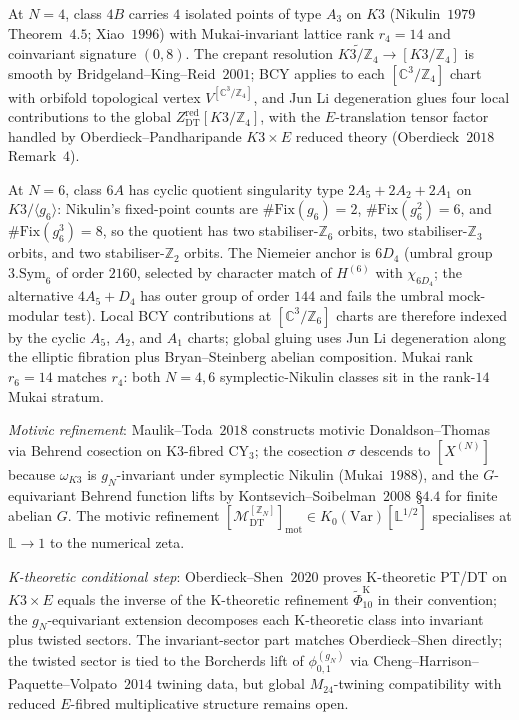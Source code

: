 \begin{remark}
At $N = 4$, class $4B$ carries $4$ isolated points of type $A_3$ on $K3$ (Nikulin~$1979$ Theorem~$4.5$; Xiao~$1996$) with Mukai-invariant lattice rank $r_4 = 14$ and coinvariant signature $(0, 8)$. The crepant resolution $\widetilde{K3/\mathbb{Z}_4} \to [K3/\mathbb{Z}_4]$ is smooth by Bridgeland--King--Reid~$2001$; BCY applies to each $[\mathbb{C}^3/\mathbb{Z}_4]$ chart with orbifold topological vertex $V^{[\mathbb{C}^3/\mathbb{Z}_4]}$, and Jun Li degeneration glues four local contributions to the global $Z^{\mathrm{red}}_{\mathrm{DT}}[K3/\mathbb{Z}_4]$, with the $E$-translation tensor factor handled by Oberdieck--Pandharipande $K3 \times E$ reduced theory (Oberdieck~$2018$ Remark~$4$).

At $N = 6$, class $6A$ has cyclic quotient singularity type $2 A_5 + 2 A_2 + 2 A_1$ on $K3/\langle g_6\rangle$: Nikulin's fixed-point counts are $\#\mathrm{Fix}(g_6)=2$, $\#\mathrm{Fix}(g_6^2)=6$, and $\#\mathrm{Fix}(g_6^3)=8$, so the quotient has two stabiliser-$\mathbb{Z}_6$ orbits, two stabiliser-$\mathbb{Z}_3$ orbits, and two stabiliser-$\mathbb{Z}_2$ orbits. The Niemeier anchor is $6 D_4$ (umbral group $3.\mathrm{Sym}_6$ of order $2160$, selected by character match of $H^{(6)}$ with $\chi_{6 D_4}$; the alternative $4 A_5 + D_4$ has outer group of order $144$ and fails the umbral mock-modular test). Local BCY contributions at $[\mathbb{C}^3/\mathbb{Z}_6]$ charts are therefore indexed by the cyclic $A_5$, $A_2$, and $A_1$ charts; global gluing uses Jun Li degeneration along the elliptic fibration plus Bryan--Steinberg abelian composition. Mukai rank $r_6 = 14$ matches $r_4$: both $N = 4, 6$ symplectic-Nikulin classes sit in the rank-$14$ Mukai stratum.

\emph{Motivic refinement}: Maulik--Toda~$2018$ constructs motivic Donaldson--Thomas via Behrend cosection on K3-fibred CY$_3$; the cosection $\sigma$ descends to $[X^{(N)}]$ because $\omega_{K3}$ is $g_N$-invariant under symplectic Nikulin (Mukai~$1988$), and the $G$-equivariant Behrend function lifts by Kontsevich--Soibelman~$2008$ \S$4.4$ for finite abelian $G$. The motivic refinement $[\mathcal{M}^{[\mathbb{Z}_N]}_{\mathrm{DT}}]_{\mathrm{mot}} \in K_0(\mathrm{Var})[\mathbb{L}^{1/2}]$ specialises at $\mathbb{L} \to 1$ to the numerical zeta.

\emph{K-theoretic conditional step}: Oberdieck--Shen~$2020$ proves K-theoretic PT/DT on $K3 \times E$ equals the inverse of the K-theoretic refinement \(\widetilde\Phi_{10}^{\mathrm{K}}\) in their convention; the $g_N$-equivariant extension decomposes each K-theoretic class into invariant plus twisted sectors. The invariant-sector part matches Oberdieck--Shen directly; the twisted sector is tied to the Borcherds lift of $\phi^{(g_N)}_{0, 1}$ via Cheng--Harrison--Paquette--Volpato~$2014$ twining data, but global $M_{24}$-twining compatibility with reduced $E$-fibred multiplicative structure remains open.
\end{remark}

